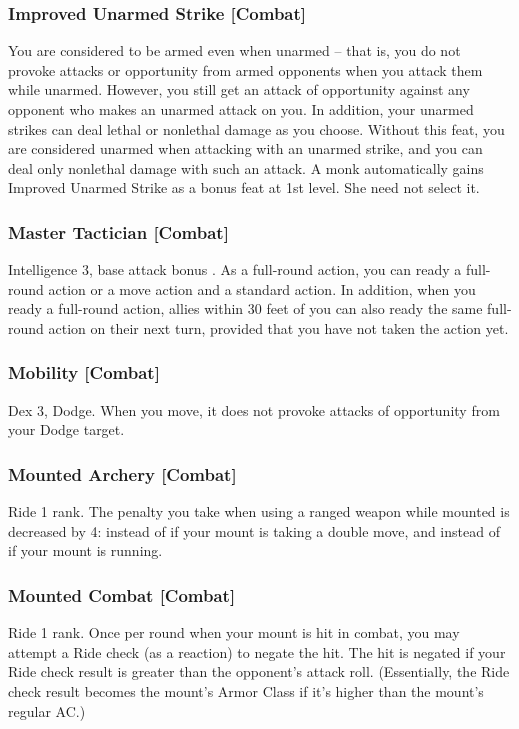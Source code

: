 \subsubsection{Improved Unarmed Strike [Combat]}
 You are considered to be armed even when unarmed -- that is, you do not provoke attacks or opportunity from armed opponents when you attack them while unarmed. However, you still get an attack of opportunity against any opponent who makes an unarmed attack on you.
In addition, your unarmed strikes can deal lethal or nonlethal damage as you choose.
 Without this feat, you are considered unarmed when attacking with an unarmed strike, and you can deal only nonlethal damage with such an attack.
 A monk automatically gains Improved Unarmed Strike as a bonus feat at 1st level. She need not select it.

\subsubsection{Master Tactician [Combat]}
\featpre Intelligence 3, base attack bonus .
\featben As a full-round action, you can ready a full-round action or a move action and a standard action. In addition, when you ready a full-round action, allies within 30 feet of you can also ready the same full-round action on their next turn, provided that you have not taken the action yet.

\subsubsection{Mobility [Combat]}
 Dex 3, Dodge.
 When you move, it does not provoke attacks of opportunity from your Dodge target.

\subsubsection{Mounted Archery [Combat]}
\featpre Ride 1 rank.
 The penalty you take when using a ranged weapon while mounted is decreased by 4:  instead of  if your mount is taking a double move, and  instead of  if your mount is running.

\subsubsection{Mounted Combat [Combat]}
 Ride 1 rank.
 Once per round when your mount is hit in combat, you may attempt a Ride check (as a reaction) to negate the hit. The hit is negated if your Ride check result is greater than the opponent's attack roll. (Essentially, the Ride check result becomes the mount's Armor Class if it's higher than the mount's regular AC.)%

